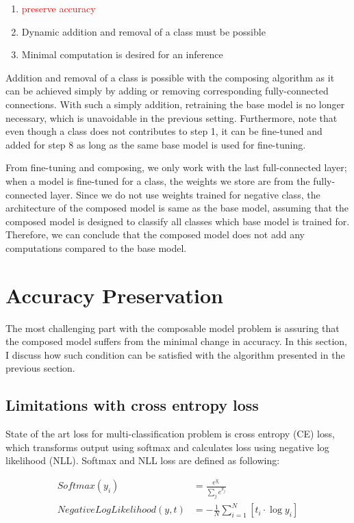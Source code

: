 \documentclass{article}
\newcommand{\red}[1]{\textcolor{red}{#1}}
\begin{document}
\begin{enumerate}
    \item \red{preserve accuracy}
    \item Dynamic addition and removal of a class must be possible
    \item Minimal computation is desired for an inference
\end{enumerate}

Addition and removal of a class is possible with the composing algorithm as it can be achieved simply by adding or removing corresponding fully-connected connections.
With such a simply addition, retraining the base model is no longer necessary, which is unavoidable in the previous setting. Furthermore, note that even though a class does not contributes to step 1, it can be fine-tuned and added for step 8 as long as the same base model is used for fine-tuning.

From fine-tuning and composing, we only work with the last full-connected layer; when a model is fine-tuned for a class, the weights we store are from the fully-connected layer.
Since we do not use weights trained for negative class, the architecture of the composed model is same as the base model, assuming that the composed model is designed to classify all classes which base model is trained for. Therefore, we can conclude that the composed model does not add any computations compared to the base model.

\section{Accuracy Preservation}

The most challenging part with the composable model problem is assuring that the composed model suffers from the minimal change in accuracy. In this section, I discuss how such condition can be satisfied with the algorithm presented in the previous section.

\subsection{Limitations with cross entropy loss}

State of the art loss for multi-classification problem is cross entropy (CE) loss, which transforms output using softmax and calculates loss using negative log likelihood (NLL).
Softmax and NLL loss are defined as following:

\begin{align*}
Softmax(y_i) &= \frac{e^{y_i}}{\sum_{j}e^{y_j}} \\
NegativeLogLikelihood(y, t) & = -\frac{1}{N}\sum_{i=1}^N \left[ t_i \cdot \log y_i\right] \\
\end{align*}
\end{document}
